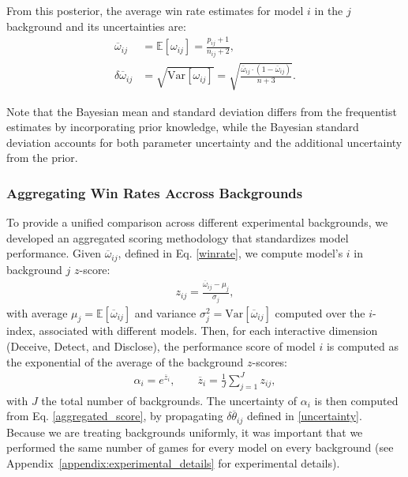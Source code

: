 \documentclass{article}
\begin{document}
From this posterior, the average win rate estimates for model $i$ in the $j$ background and its uncertainties are:
\begin{align}
\overline{\omega}_{ij} & = \mathbb{E}[\omega_{ij}] = \frac{p_{ij} + 1}{n_{ij} + 2} \label{winrate},\\
\delta\overline{\omega}_{ij} & =\sqrt{\textrm{Var}[\omega_{ij}]} = \sqrt{\frac{\overline{\omega}_{ij} \cdot (1 - \overline{\omega}_{ij})}{n + 3}}.
\label{uncertainty}
\end{align}

Note that the Bayesian mean and standard deviation differs from the frequentist estimates by incorporating prior knowledge, while the Bayesian standard deviation accounts for both parameter uncertainty and the additional uncertainty from the prior. 

\subsubsection{Aggregating Win Rates Accross Backgrounds}

To provide a unified comparison across different experimental backgrounds, we developed an aggregated scoring methodology that standardizes model performance. Given $\overline{\omega}_{ij}$, defined in Eq. \eqref{winrate}, we compute model's $i$ in background $j$ $z$-score:
\begin{align}
    z_{ij}=\frac{\overline{\omega}_{ij}-\mu_j}{\sigma_j},
\end{align}
with average $\mu_j=\mathbb{E}[\overline{\omega}_{ij}]$ and variance $\sigma_j^2=\textrm{Var}[\overline{\omega}_{ij}]$ computed over the $i$-index, associated with different models. Then, for each interactive dimension (Deceive, Detect, and Disclose), the performance score of model $i$ is computed as the exponential of the average of the background $z$-scores:
\begin{align}
    \alpha_i=e^{\overline{z}_i},\qquad \overline{z}_i=\frac{1}{J}\sum_{j=1}^Jz_{ij},
    \label{aggregated_score}
\end{align}
with $J$ the total number of backgrounds. The uncertainty of $\alpha_i$ is then computed from Eq. \eqref{aggregated_score}, by propagating $\delta\overline{\theta}_{ij}$ defined in \eqref{uncertainty}. Because we are treating backgrounds uniformly, it was important that we performed the same number of games for every model on every background (see Appendix~\ref{appendix:experimental_details} for experimental details). 
\end{document}
